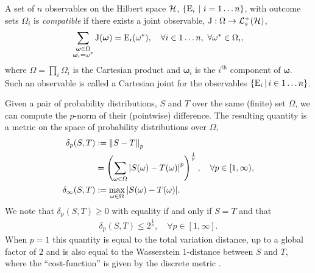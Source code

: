 A set of $n$ observables on the Hilbert space $\mathcal{H}$, $\left\{\operatorname{E}_i\,\,\middle|\,\,i=1\hdots n\right\}$, with outcome sets $\Omega_i$ is \emph{compatible} if there exists a joint observable, $\opj: \Omega \to \posops[\hcal]$,
\begin{align}
  \label{eqn:cart-joint}
  \sum_{\substack{\bm{\omega}\in\Omega\\\bm{\omega}_i = \omega^*}}\operatorname{J}(\bm{\omega}) = \operatorname{E}_i(\omega^*), \quad \forall i\in 1\hdots n,\ \forall \omega^*\in\Omega_i,
\end{align}
where $\Omega = \prod_i \Omega_i$ is the Cartesian product and $\bm{\omega}_i$ is the $i^\text{th}$ component of $\bm{\omega}$. Such an observable is called a Cartesian joint for the observables $\left\{\operatorname{E}_i\,\middle|\,i\in 1\hdots n\right\}$.

Given a pair of probability distributions, $S$ and $T$  over the same (finite) set $\Omega$, we can compute the $p$-norm of their (pointwise) difference. The resulting quantity is a metric on the space of probability distributions over $\Omega$,
\begin{align}
  \delta_p(S,T) &\defeq \pnorm{S - T}\\
                 &= \left(\sum_{\omega\in\Omega}\abs{S(\omega) - T(\omega)}^p\right)^{\frac{1}{p}}, \quad \forall p\in[1,\infty),\\
  \delta_\infty(S,T) &\defeq \max_{\omega\in\Omega}\abs{S(\omega) - T(\omega)}.
\end{align}
We note that $\delta_p(S,T) \geq 0$ with equality if and only if $S = T$ and that
\begin{align}
  \delta_p(S,T) \leq 2^{\frac{1}{p}}, \quad \forall p\in [1,\infty].
\end{align}
When $p=1$ this quantity is equal to the total variation distance, up to a global factor of $2$ and is also equal to the Wasserstein $1$-distance between $S$ and $T$, where the ``cost-function'' is given by the discrete metric \cite{markov-mixing-levin-peres-wilmer}\cite{optimal-transport-villani}.

